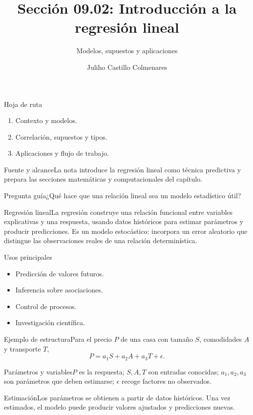 \documentclass[10pt,aspectratio=169]{beamer}
\title[Introducción a la regresión lineal]{Sección 09.02: Introducción a la regresión lineal}\subtitle{Modelos, supuestos y aplicaciones}\author[J. Castillo Colmenares]{Juliho Castillo Colmenares}\institute{Tecnológico de Monterrey}\date{}
\begin{document}
\begin{frame}[plain]\titlepage\end{frame}
\begin{frame}{Hoja de ruta}\small\begin{enumerate}\item Contexto y modelos.\item Correlación, supuestos y tipos.\item Aplicaciones y flujo de trabajo.\end{enumerate}\end{frame}
\begin{frame}{Fuente y alcance}\small La nota introduce la regresión lineal como técnica predictiva y prepara las secciones matemáticas y computacionales del capítulo.\begin{block}{Pregunta guía}¿Qué hace que una relación lineal sea un modelo estadístico útil?\end{block}\end{frame}
\begin{frame}{Regresión lineal}\small La regresión construye una relación funcional entre variables explicativas y una respuesta, usando datos históricos para estimar parámetros y producir predicciones. Es un modelo estocástico: incorpora un error aleatorio que distingue las observaciones reales de una relación determinística.\end{frame}
\begin{frame}{Usos principales}\small\begin{itemize}\item Predicción de valores futuros.\item Inferencia sobre asociaciones.\item Control de procesos.\item Investigación científica.\end{itemize}\end{frame}
\begin{frame}{Ejemplo de estructura}\small Para el precio $P$ de una casa con tamaño $S$, comodidades $A$ y transporte $T$,\[P=a_1S+a_2A+a_3T+\epsilon.\]\end{frame}
\begin{frame}{Parámetros y variables}\small $P$ es la respuesta; $S,A,T$ son entradas conocidas; $a_1,a_2,a_3$ son parámetros que deben estimarse; $\epsilon$ recoge factores no observados.\end{frame}
\begin{frame}{Estimación}\small Los parámetros se obtienen a partir de datos históricos. Una vez estimados, el modelo puede producir valores ajustados y predicciones nuevas.\end{frame}
\end{document}
